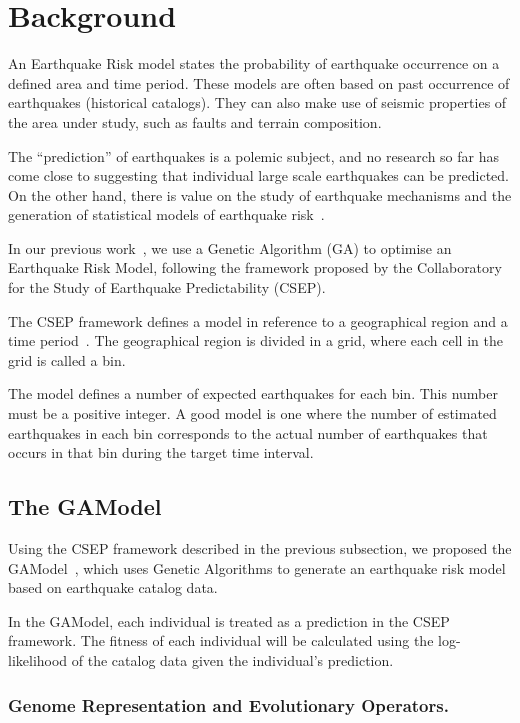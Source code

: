 \section{Background}
\label{sec:background}

An Earthquake Risk model states the probability of earthquake
occurrence on a defined area and time period. These models are often
based on past occurrence of earthquakes (historical catalogs).  They
can also make use of seismic properties of the area under study, such
as faults and terrain composition.

The ``prediction'' of earthquakes is a polemic subject, and no
research so far has come close to suggesting that individual large
scale earthquakes can be predicted. On the other hand, there is value
on the study of earthquake mechanisms and the generation of
statistical models of earthquake risk~\cite{Nature1999}.

In our previous work~\cite{ecta14}, we use a Genetic Algorithm (GA) to
optimise an Earthquake Risk Model, following the framework proposed by
the Collaboratory for the Study of Earthquake Predictability (CSEP).

The CSEP framework defines a model in reference to a geographical
region and a time period~\cite{zechar2010evaluating}. The geographical
region is divided in a grid, where each cell in the grid is called a
bin.

The model defines a number of expected earthquakes for each bin.  This
number must be a positive integer. A good model is one where the
number of estimated earthquakes in each bin corresponds to the actual
number of earthquakes that occurs in that bin during the target time
interval.

\subsection{The GAModel}\label{sec:background:gamodel}

Using the CSEP framework described in the previous subsection, we
proposed the GAModel~\cite{ecta14}, which uses Genetic Algorithms to
generate an earthquake risk model based on earthquake catalog data.

In the GAModel, each individual is treated as a prediction in the CSEP
framework. The fitness of each individual will be calculated using the
log-likelihood of the catalog data given the individual's prediction.

\subsubsection*{Genome Representation and Evolutionary Operators.}

